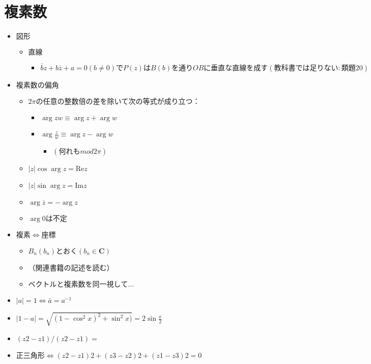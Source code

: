 \documentclass[dvipdfmx,uplatex]{jsarticle}
\begin{document}
\section{複素数}
\begin{itemize}
	\item $ 図形$
	\begin{itemize}
		\item $ 直線$
		\begin{itemize}
			\item $ \bar{b} z + b \bar{z}+ a = 0 (b \neq 0) でP(z)はB(b)を通りOBに垂直な直線を成す(教科書では足りない:類題20)$
		\end{itemize}
	\end{itemize}
	\item $ 複素数の偏角$
		\begin{itemize}
			\item $ 2 \pi の任意の整数倍の差を除いて次の等式が成り立つ：$
			\begin{itemize}
				\item $ \arg zw \equiv \arg z + \arg w$
				\item $ \arg \frac{z}{w} \equiv \arg z − \arg w$
				\begin{itemize}
					\item $ (何れも mod 2π)$
				\end{itemize}
			\end{itemize}
		\item $ |z| \cos \arg z = \mathrm{Re} z$
		\item $ |z| \sin \arg z = \mathrm{Im} z$
		\item $ \arg \overline{z} = - \arg z$
		\item $ \arg 0 は不定$
	\end{itemize}
	\item $ 複素 \Leftrightarrow 座標$
	\begin{itemize}
		\item $ B_n(b_n)とおく (b_n \in \bm{C})$
		\item $ （関連書籍の記述を読む）$
		\item $ ベクトルと複素数を同一視して...$
	\end{itemize}
	\item $ |a| = 1 \Leftrightarrow \bar{a} = a^{-1} $
	\item $ |1 - a| = \sqrt{(1 - \cos^2 x)^2 + \sin^2 x)} = 2 \sin \frac{x}{2}$
	\item $ (z2-z1)/(z2-z1) =$
	\item $ 正三角形\Leftrightarrow(z2-z1)2+(z3-z2)2+(z1-z3)2=0$

\end{itemize}
\end{document}

